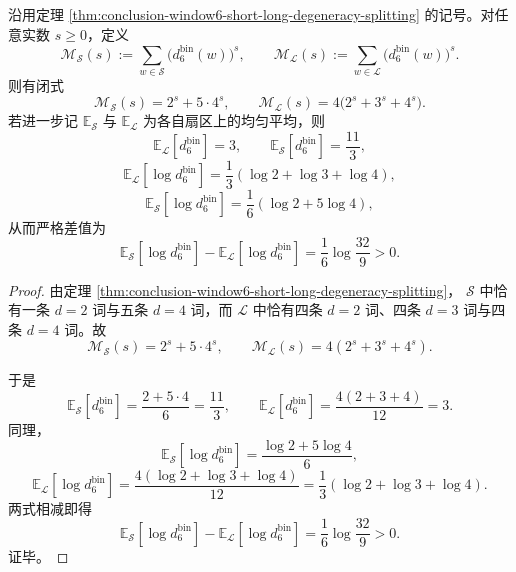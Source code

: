 \begin{corollary}\label{cor:conclusion-window6-short-long-sector-moments-closed}
沿用定理 \ref{thm:conclusion-window6-short-long-degeneracy-splitting} 的记号。对任意实数 \(s\ge 0\)，定义
\[
\mathcal M_{\mathcal S}(s):=\sum_{w\in\mathcal S}\bigl(d_6^{\mathrm{bin}}(w)\bigr)^s,
\qquad
\mathcal M_{\mathcal L}(s):=\sum_{w\in\mathcal L}\bigl(d_6^{\mathrm{bin}}(w)\bigr)^s.
\]
则有闭式
\[
\boxed{\;
\mathcal M_{\mathcal S}(s)=2^s+5\cdot 4^s,
\qquad
\mathcal M_{\mathcal L}(s)=4\bigl(2^s+3^s+4^s\bigr).\;}
\]
若进一步记 \(\mathbb E_{\mathcal S}\) 与 \(\mathbb E_{\mathcal L}\) 为各自扇区上的均匀平均，则
\[
\boxed{\;
\mathbb E_{\mathcal L}[d_6^{\mathrm{bin}}]=3,\qquad
\mathbb E_{\mathcal S}[d_6^{\mathrm{bin}}]=\frac{11}{3},\;}
\]
\[
\boxed{\;
\mathbb E_{\mathcal L}[\log d_6^{\mathrm{bin}}]
=
\frac13(\log 2+\log 3+\log 4),\;}
\]
\[
\boxed{\;
\mathbb E_{\mathcal S}[\log d_6^{\mathrm{bin}}]
=
\frac16(\log 2+5\log 4),\;}
\]
从而严格差值为
\[
\boxed{\;
\mathbb E_{\mathcal S}[\log d_6^{\mathrm{bin}}]
-\mathbb E_{\mathcal L}[\log d_6^{\mathrm{bin}}]
=
\frac16\log\frac{32}{9}>0.\;}
\]
\end{corollary}
\begin{proof}
由定理 \ref{thm:conclusion-window6-short-long-degeneracy-splitting}，
\(\mathcal S\) 中恰有一条 \(d=2\) 词与五条 \(d=4\) 词，而 \(\mathcal L\) 中恰有四条 \(d=2\) 词、四条 \(d=3\) 词与四条 \(d=4\) 词。故
\[
\mathcal M_{\mathcal S}(s)=2^s+5\cdot 4^s,
\qquad
\mathcal M_{\mathcal L}(s)=4(2^s+3^s+4^s).
\]

于是
\[
\mathbb E_{\mathcal S}[d_6^{\mathrm{bin}}]
=
\frac{2+5\cdot 4}{6}
=
\frac{11}{3},
\qquad
\mathbb E_{\mathcal L}[d_6^{\mathrm{bin}}]
=
\frac{4(2+3+4)}{12}
=3.
\]
同理，
\[
\mathbb E_{\mathcal S}[\log d_6^{\mathrm{bin}}]
=
\frac{\log 2+5\log 4}{6},
\]
\[
\mathbb E_{\mathcal L}[\log d_6^{\mathrm{bin}}]
=
\frac{4(\log 2+\log 3+\log 4)}{12}
=
\frac13(\log 2+\log 3+\log 4).
\]
两式相减即得
\[
\mathbb E_{\mathcal S}[\log d_6^{\mathrm{bin}}]
-\mathbb E_{\mathcal L}[\log d_6^{\mathrm{bin}}]
=
\frac16\log\frac{32}{9}>0.
\]
证毕。
\end{proof}
\endinput
